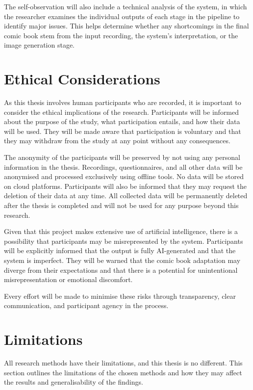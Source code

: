 The self-observation will also include a technical analysis of the system, in which the researcher examines the individual outputs of each stage in the pipeline to identify major issues. This helps determine whether any shortcomings in the final comic book stem from the input recording, the system's interpretation, or the image generation stage.

\section{Ethical Considerations}
As this thesis involves human participants who are recorded, it is important to consider the ethical implications of the research. Participants will be informed about the purpose of the study, what participation entails, and how their data will be used. They will be made aware that participation is voluntary and that they may withdraw from the study at any point without any consequences.

The anonymity of the participants will be preserved by not using any personal information in the thesis. Recordings, questionnaires, and all other data will be anonymised and processed exclusively using offline tools. No data will be stored on cloud platforms. Participants will also be informed that they may request the deletion of their data at any time. All collected data will be permanently deleted after the thesis is completed and will not be used for any purpose beyond this research.

Given that this project makes extensive use of artificial intelligence, there is a possibility that participants may be misrepresented by the system. Participants will be explicitly informed that the output is fully AI-generated and that the system is imperfect. They will be warned that the comic book adaptation may diverge from their expectations and that there is a potential for unintentional misrepresentation or emotional discomfort.

Every effort will be made to minimise these risks through transparency, clear communication, and participant agency in the process.

\section{Limitations}
All research methods have their limitations, and this thesis is no different. This section outlines the limitations of the chosen methods and how they may affect the results and generalisability of the findings.

